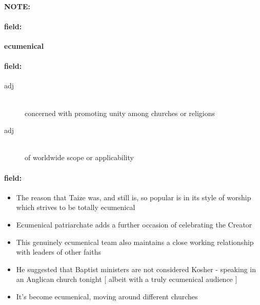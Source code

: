 \documentclass[12pt]{article}
\newenvironment{note}{\paragraph{NOTE:}}{}
\newenvironment{field}{\paragraph{field:}}{}
\begin{document}
\begin{note}
\begin{field}
\textbf{\large ecumenical}
\end{field}


\begin{field}
\begin{description}
\item[adj] \hfill \\ 
concerned with promoting unity among churches or religions

\item[adj] \hfill \\ 
of worldwide scope or applicability

\end{description}
\end{field}

\begin{field}
\begin{itemize}
\item The reason that Taize was, and still is, so popular is in its style of worship which strives to be totally ecumenical
\item Ecumenical patriarchate adds a further occasion of celebrating the Creator
\item This genuinely ecumenical team also maintains a close working relationship with leaders of other faiths
\item He suggested that Baptist ministers are not considered Kosher - speaking in an Anglican church tonight [ albeit with a truly ecumenical audience ] 
\item It's become ecumenical, moving around different churches
\end{itemize}
\end{field}
\end{note}
\end{document}
